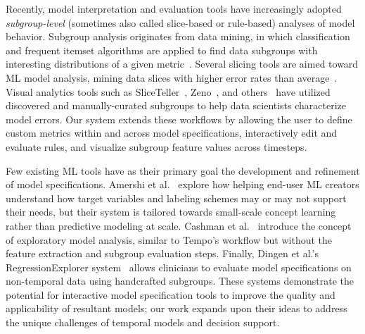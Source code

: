 Recently, model interpretation and evaluation tools have increasingly adopted \textit{subgroup-level} (sometimes also called slice-based or rule-based) analyses of model behavior. 
Subgroup analysis originates from data mining, in which classification and frequent itemset algorithms are applied to find data subgroups with interesting distributions of a given metric~\cite{herrera_overview_2011}.
Several slicing tools are aimed toward ML model analysis, mining data slices with higher error rates than average~\cite{chung_automated_2020,eyuboglu_domino_2022}.
Visual analytics tools such as SliceTeller~\cite{zhang_sliceteller_2022}, Zeno~\cite{cabrera_zeno_2023}, and others~\cite{kahng_visual_2016,zhang_manifold_2019} have utilized discovered and manually-curated subgroups to help data scientists characterize model errors.
Our system extends these workflows by allowing the user to define custom metrics within and across model specifications, interactively edit and evaluate rules, and visualize subgroup feature values across timesteps.

Few existing ML tools have as their primary goal the development and refinement of model specifications. Amershi et al.~\cite{amershi_examining_2010} explore how helping end-user ML creators understand how target variables and labeling schemes may or may not support their needs, but their system is tailored towards small-scale concept learning rather than predictive modeling at scale. Cashman et al.~\cite{cashman_user-based_2019} introduce the concept of exploratory model analysis, similar to Tempo's workflow but without the feature extraction and subgroup evaluation steps. Finally, Dingen et al.'s RegressionExplorer system~\cite{dingen_regressionexplorer_2019} allows clinicians to evaluate model specifications on non-temporal data using handcrafted subgroups. These systems demonstrate the potential for interactive model specification tools to improve the quality and applicability of resultant models; our work expands upon their ideas to address the unique challenges of temporal models and decision support.